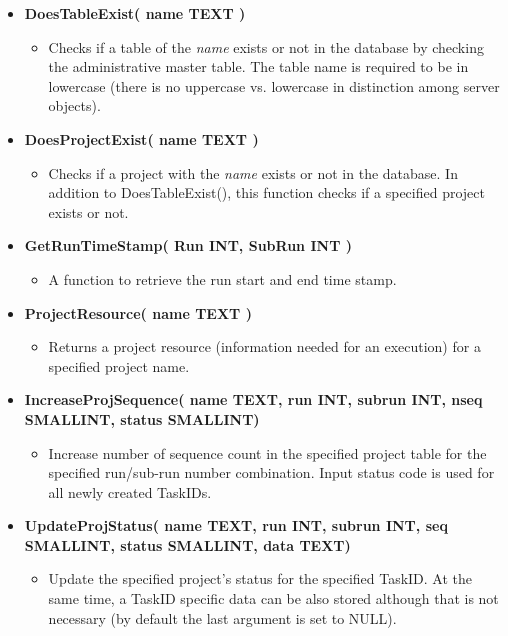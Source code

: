 \begin{itemize}
  \item {\bf DoesTableExist( name TEXT )}
    \begin{itemize}
      \item Checks if a table of the {\it name} exists or not in the database
        by checking the administrative master table. The table name is required
        to be in lowercase (there is no uppercase vs. lowercase in distinction
        among {\psql} server objects).
    \end{itemize}
  \item {\bf DoesProjectExist( name TEXT )}
    \begin{itemize}
      \item Checks if a project with the {\it name} exists or not in the 
        database. In addition to DoesTableExist(), this function checks
        if a specified project exists or not.
    \end{itemize}
  \item {\bf GetRunTimeStamp( Run INT, SubRun INT )}
    \begin{itemize}
      \item A function to retrieve the run start and end time stamp.
    \end{itemize}
  \item {\bf ProjectResource( name TEXT )}
    \begin{itemize}
      \item Returns a project resource (information needed for an execution)
        for a specified project name.
    \end{itemize}
  \item {\bf IncreaseProjSequence( name TEXT, run INT, subrun INT, nseq
    SMALLINT, status SMALLINT) }
    \begin{itemize}
      \item Increase number of sequence count in the specified project table
        for the specified run/sub-run number combination. Input status code 
        is used for all newly created TaskIDs.
    \end{itemize}
  \item {\bf UpdateProjStatus( name TEXT, run INT, subrun INT, seq SMALLINT,
    status SMALLINT, data TEXT)}
    \begin{itemize}
      \item Update the specified project's status for the specified TaskID. 
        At the same time, a TaskID specific data can be also stored although
        that is not necessary (by default the last argument is set to NULL).

\end{itemize}
\end{itemize}
